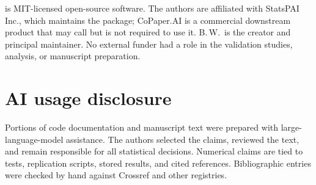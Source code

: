 \statspai{} is MIT-licensed open-source software. The authors are
affiliated with StatsPAI Inc., which maintains the package; CoPaper.AI
is a commercial downstream product that may call \statspai{} but is not
required to use it. B.\,W.\ is the creator and principal maintainer. No
external funder had a role in the validation studies, analysis, or
manuscript preparation.

\section*{AI usage disclosure}

Portions of code documentation and manuscript text were prepared with
large-language-model assistance. The authors selected the claims,
reviewed the text, and remain responsible for all statistical decisions.
Numerical claims are tied to tests, replication scripts, stored results,
and cited references. Bibliographic entries were checked by hand against
Crossref and other registries.